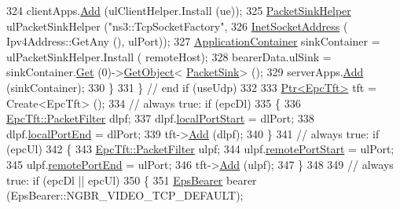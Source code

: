 \begin{DoxyCode}
324                       clientApps.\hyperlink{classns3_1_1ApplicationContainer_ad09ab1a1ad5849d518d5f4c262e38152}{Add} (ulClientHelper.Install (ue));
325                       \hyperlink{classns3_1_1PacketSinkHelper}{PacketSinkHelper} ulPacketSinkHelper (\textcolor{stringliteral}{"ns3::TcpSocketFactory"}, 
326                                                            \hyperlink{classns3_1_1InetSocketAddress}{InetSocketAddress} (
      Ipv4Address::GetAny (), ulPort));
327                       \hyperlink{classns3_1_1ApplicationContainer}{ApplicationContainer} sinkContainer = ulPacketSinkHelper.Install (
      remoteHost);
328                       bearerData.ulSink = sinkContainer.\hyperlink{classns3_1_1ApplicationContainer_a9e565807abd4213a56566a7ccd8d7509}{Get} (0)->\hyperlink{classns3_1_1Object_a13e18c00017096c8381eb651d5bd0783}{GetObject}<
      \hyperlink{classns3_1_1PacketSink}{PacketSink}> ();
329                       serverApps.\hyperlink{classns3_1_1ApplicationContainer_ad09ab1a1ad5849d518d5f4c262e38152}{Add} (sinkContainer);  
330                     \}
331                 \} \textcolor{comment}{// end if (useUdp)}
332 
333               \hyperlink{classns3_1_1Ptr}{Ptr<EpcTft>} tft = Create<EpcTft> ();
334               \textcolor{comment}{// always true: if (epcDl)}
335                 \{
336                   \hyperlink{structns3_1_1EpcTft_1_1PacketFilter}{EpcTft::PacketFilter} dlpf;
337                   dlpf.\hyperlink{structns3_1_1EpcTft_1_1PacketFilter_afd505cda437b1687abc4432a8bcefbaf}{localPortStart} = dlPort;
338                   dlpf.\hyperlink{structns3_1_1EpcTft_1_1PacketFilter_a3236947a93fdd516b1d978467eaa0484}{localPortEnd} = dlPort;
339                   tft->\hyperlink{classns3_1_1EpcTft_a1228456a8abbe48cbc89bbe2d2e9af48}{Add} (dlpf); 
340                 \}
341               \textcolor{comment}{// always true: if (epcUl)}
342                 \{
343                   \hyperlink{structns3_1_1EpcTft_1_1PacketFilter}{EpcTft::PacketFilter} ulpf;
344                   ulpf.\hyperlink{structns3_1_1EpcTft_1_1PacketFilter_aa96ab9356c91b14059220d00155c32b5}{remotePortStart} = ulPort;
345                   ulpf.\hyperlink{structns3_1_1EpcTft_1_1PacketFilter_a4bcdd15a9526e27eabd474276f691cf1}{remotePortEnd} = ulPort;
346                   tft->\hyperlink{classns3_1_1EpcTft_a1228456a8abbe48cbc89bbe2d2e9af48}{Add} (ulpf);
347                 \}
348 
349               \textcolor{comment}{// always true: if (epcDl || epcUl)}
350                 \{
351                   \hyperlink{structns3_1_1EpsBearer}{EpsBearer} bearer (EpsBearer::NGBR\_VIDEO\_TCP\_DEFAULT);

\end{DoxyCode}
